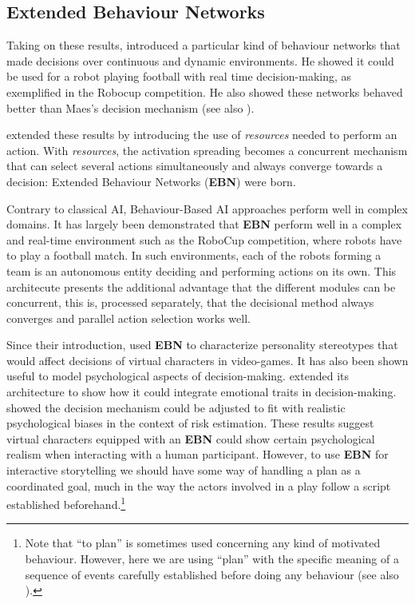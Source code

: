 \documentclass[
		twoside,openright,titlepage,numbers=noenddot,manychapters,
		headinclude,%
                footinclude=false,cleardoublepage=empty,
                BCOR=5mm,
		fontsize=11pt, %
                 enabledeprecatedfontcommands]{scrreprt}
\begin{document}
\subsection{Extended Behaviour Networks}

Taking on these results, \cite{dorer1999bnc} introduced a particular kind of behaviour networks that made decisions over continuous and dynamic environments. He showed it could be used for a robot playing football with real time decision-making, as exemplified in the Robocup competition. He also showed these networks behaved better than Maes’s decision mechanism (see also \cite{nebel2004behaviour}). 

\cite{dorer2004ebn} extended these results by introducing the use of \emph{resources} needed to perform an action. With \emph{resources}, the activation spreading becomes a concurrent mechanism that can select several actions simultaneously and always converge towards a decision: Extended Behaviour Networks (\textbf{EBN}) were born. 



Contrary to classical AI, Behaviour-Based AI approaches perform well in complex domains. It has largely been demonstrated that \textbf{EBN} perform well in a complex and real-time environment such as the RoboCup competition, where robots have to play a football match. In such environments, each of the robots forming a team is an autonomous entity deciding and performing actions on its own.  This architecute presents the additional advantage that the different modules can be concurrent, this is, processed separately, that the decisional method always converges and parallel action selection works well. 


Since their introduction, \cite{DaSilvaCorreaPinto2005} used \textbf{EBN} to characterize personality stereotypes that would affect decisions of virtual characters in video-games.
It has also been shown useful to model psychological aspects of decision-making. \cite{johansson2009affective}  extended its architecture to show how it could integrate emotional traits in decision-making. \cite{dorer2010modeling} showed the decision mechanism could be adjusted to fit with realistic psychological biases in the context of risk estimation. These results suggest virtual characters equipped with an \textbf{EBN} could show certain psychological realism when interacting with a human participant. However, to use \textbf{EBN} for interactive storytelling we should have some way of handling a plan as a coordinated goal, much in the way the actors involved in a play follow a script established beforehand.\footnote{ Note that “to plan” is sometimes used concerning any kind of motivated behaviour. However, here we are using “plan” with the specific meaning of a sequence of events carefully established before doing any behaviour (see also \cite{Agre1990}). }
\end{document}
